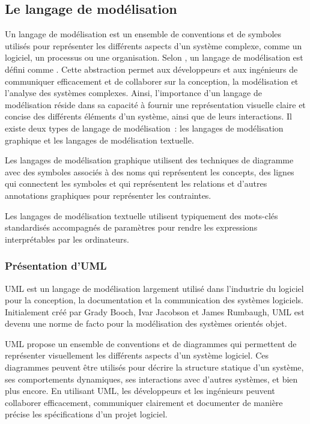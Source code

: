 \subsection{Le langage de modélisation}
Un langage de modélisation est un ensemble de conventions et de symboles utilisés pour représenter
les différents aspects d’un système complexe, comme un logiciel, un processus ou une
organisation. Selon \textcite{weilkiens2011systems}, un langage de modélisation est défini comme
.
Cette abstraction permet aux développeurs et aux ingénieurs de
communiquer efficacement et de collaborer sur la conception, la modélisation et l’analyse des
systèmes complexes. Ainsi, l’importance d'un langage de modélisation réside dans sa capacité à fournir une représentation
visuelle claire et concise des différents éléments d'un système, ainsi que de leurs interactions.
Il existe deux types de langage de modélisation : les langages de modélisation graphique
et les langages de modélisation textuelle.

Les langages de modélisation graphique utilisent des techniques de diagramme
avec des symboles associés à des noms qui représentent les concepts, des lignes
qui connectent les symboles et qui représentent les relations et d’autres
annotations graphiques pour représenter les contraintes.

Les langages de modélisation textuelle utilisent typiquement des mots-clés
standardisés accompagnés de paramètres pour rendre les expressions interprétables
par les ordinateurs.

\subsubsection{Présentation d'UML}
\ac{UML} est un langage de modélisation largement utilisé dans l’industrie
du logiciel pour la conception, la documentation et la communication des systèmes logiciels.
Initialement créé par Grady Booch, Ivar Jacobson et James Rumbaugh, UML est devenu une norme
de facto pour la modélisation des systèmes orientés objet.

UML propose un ensemble de conventions et de diagrammes qui permettent de
représenter visuellement les différents aspects d’un système logiciel. Ces
diagrammes peuvent être utilisés pour décrire la structure statique d’un système,
ses comportements dynamiques, ses interactions avec d’autres systèmes, et bien
plus encore. En utilisant UML, les développeurs et les ingénieurs peuvent
collaborer efficacement, communiquer clairement et documenter de manière précise
les spécifications d’un projet logiciel.

